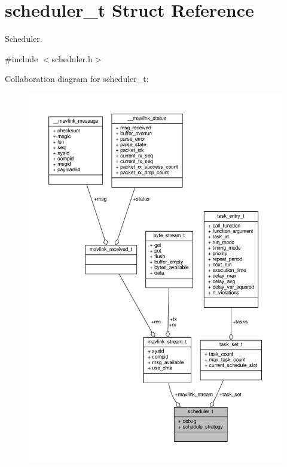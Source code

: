 \hypertarget{structscheduler__t}{\section{scheduler\+\_\+t Struct Reference}
\label{structscheduler__t}
}


Scheduler.  




{\ttfamily \#include $<$scheduler.\+h$>$}



Collaboration diagram for scheduler\+\_\+t\+:
\nopagebreak
\begin{figure}[H]
\begin{center}
\leavevmode
\includegraphics[width=350pt]{structscheduler__t__coll__graph}
\end{center}
\end{figure}
